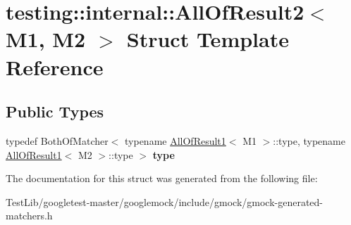 \hypertarget{structtesting_1_1internal_1_1AllOfResult2}{}\section{testing\+:\+:internal\+:\+:All\+Of\+Result2$<$ M1, M2 $>$ Struct Template Reference}
\label{structtesting_1_1internal_1_1AllOfResult2}
\subsection*{Public Types}
\begin{DoxyCompactItemize}
\item 
\mbox{\label{structtesting_1_1internal_1_1AllOfResult2_adec0b0ce2fdd07d398e1fdd2cdb88392}} 
typedef Both\+Of\+Matcher$<$ typename \hyperlink{structtesting_1_1internal_1_1AllOfResult1}{All\+Of\+Result1}$<$ M1 $>$\+::type, typename \hyperlink{structtesting_1_1internal_1_1AllOfResult1}{All\+Of\+Result1}$<$ M2 $>$\+::type $>$ {\bfseries type}
\end{DoxyCompactItemize}


The documentation for this struct was generated from the following file\+:\begin{DoxyCompactItemize}
\item 
Test\+Lib/googletest-\/master/googlemock/include/gmock/gmock-\/generated-\/matchers.\+h\end{DoxyCompactItemize}
